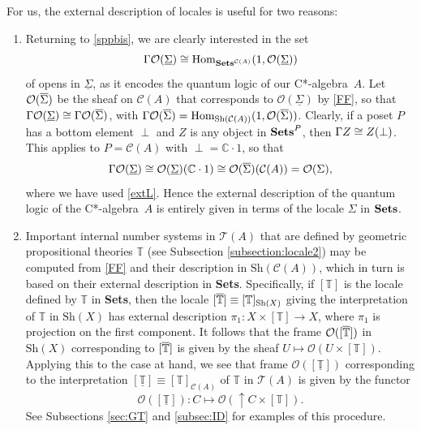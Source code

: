 \documentclass[12pt]{article}
\newcommand{\beq}{\begin{equation}}
\newcommand{\eeq}{\end{equation}}
\newcommand{\Sets}{\mbox{\textbf{Sets}}}
\newcommand{\ca}{C*-algebra} \newcommand{\jba}{JB-algebra}
\newcommand{\raw}{\rightarrow} \newcommand{\rat}{\mapsto}
\newcommand{\x}{\times} \newcommand{\hb}{\hbar}
\newcommand{\er}{\eqref}
\newcommand{\Sg}{\Sigma} \newcommand{\ta}{\tau} \newcommand{\ph}{\phi}
\newcommand{\CA}{{\mathcal A}} \newcommand{\CB}{{\mathcal B}}
\newcommand{\CO}{{\mathcal O}} \newcommand{\CP}{{\mathcal P}}
\newcommand{\C}{{\mathbb C}} \newcommand{\D}{{\mathbb D}}
\newcommand{\T}{{\mathbb T}} \newcommand{\Z}{{\mathbb Z}}
\newcommand{\Hom}{\mbox{\rm Hom}}
\newcommand{\alg}[1]{\ensuremath{#1}}
\newcommand{\functor}[1]{\ensuremath{\underline{#1}}}
\newcommand{\Sh}{\ensuremath{\mathrm{Sh}}}
\newcommand{\context}{\ensuremath{\mathcal{C}}}
\newcommand{\asstopos}{\ensuremath{\mathcal{T}}}
\renewcommand{\CA}{\mathcal{C}(A)}
\newcommand{\TA}{\mathcal{T}(A)}
\newcommand{\ulS}{\functor{\Sigma}}
\renewcommand{\TA}{\asstopos(\alg{A})}
\renewcommand{\CA}{\context(\alg{A})}
\begin{document}
For us, the external description of locales is useful for  two reasons:
\begin{enumerate}
\item Returning to \er{sppbis}, we are clearly interested in the set
$$\Gm\CO(\ulS)\cong \Hom_{\mathbf{Sets}^{\mathcal{C}(A)}}(1,\CO(\ulS))$$ of opens in
$\ulS$, as it encodes the quantum logic of our \ca\ $A$. Let  $\CO(\ovl{\Sg})$ be the
sheaf on $\mathcal{C}(A)$ that corresponds to
$\CO(\ulS)$ by \er{FF}, so that $\Gm\CO(\ulS)\cong \Gm\CO(\ovl{\Sg})$, with
$\Gm\CO(\ovl{\Sg})=\Hom_{\Sh(\mathcal{C}(A))}(1,\CO(\ovl{\Sg}))
$. Clearly, if a poset $P$ has a bottom element $\perp$ and $Z$ is any object in
$\Sets^P$, then $\Gamma Z \cong Z(\perp)$. This applies to $P=\mathcal{C}(A)$ with
$\perp=\C\cdot 1$, so that
\beq \Gm\CO(\ulS)\cong \CO(\ulS)(\C\cdot 1)\cong
\CO(\ovl{\Sg})(\mathcal{C}(A))=\CO(\Sigma),\label{eq8}\eeq
where we have used \er{extL}.
Hence the external description of the quantum logic of the \ca\ $A$ is entirely
given in terms
of the locale $\Sigma$ in $\Sets$.
\item Important internal number systems in $\TA$ that are defined by   geometric propositional theories $\T$
(see  Subsection \ref{subsection:locale2})
may be computed from \er{FF} and their description in $\Sh(\CA)$, which in turn is based on their external
 description  in \Sets. Specifically, if  $[\T]$ is the locale defined by $\T$ in \Sets, then the locale $[\ovl{\T}]\equiv [\T]_{\Sh(X)}$ 
 giving the interpretation of
 $\T$ in $\Sh(X)$ has external description $\pi_1: X\x [\T]\raw X$, where $\pi_1$ is projection on the first component.
 It follows that the frame $\CO([\ovl{\T}])$ in $\Sh(X)$ corresponding to $[\ovl{\T}]$ is given by the sheaf
 $U\mapsto \CO(U\x[\T])$. Applying this to the case at hand, we see that frame $\CO([\underline{\T}])$ corresponding to
 the interpretation $[\underline{\T}]\equiv [\T]_{\CA}$ of $\T$ in $\TA$ is given by the functor
 \beq \CO([\underline{\T}]): C\mapsto \CO(\uparrow\! C \x [\T]). \label{intT}\eeq
 See Subsections \ref{sec:GT} and \ref{subsec:ID} for examples of this procedure.
\end{enumerate}
\end{document}

